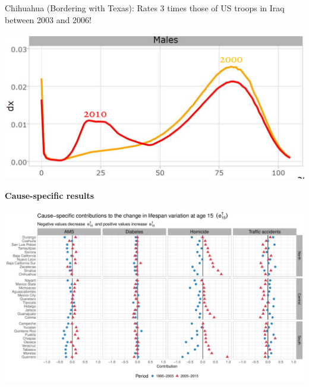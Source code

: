 \documentclass[xcolor={dvipsnames}]{beamer}
\begin{document}
\begin{frame}

\Large{
Chihuahua (Bordering with Texas): Rates 3 times those of US troops in Iraq between 2003 and 2006!
				\begin{center}
		\includegraphics[scale=.45]{Figures/Distr_chihuahua}
				\end{center}				

}
\end{frame}



\begin{frame}
\begin{center}
\Large{\textbf{Cause-specific results}}
\end{center}

\hspace*{-1cm}   
\includegraphics[scale=.38]{Figures/Figure_4}

\end{frame}
\end{document}
